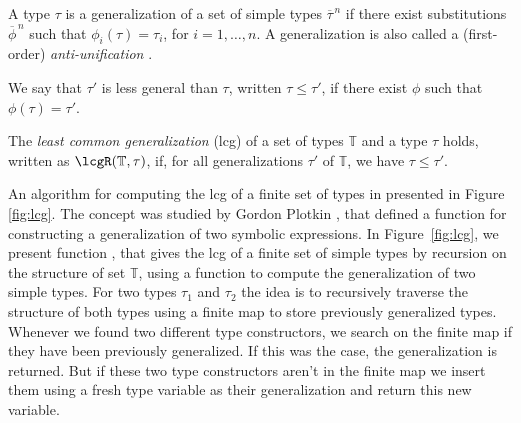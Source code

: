 A type $\tau$ is a generalization of a set of simple types
$\overline{\tau}^{\,n}$ if there exist substitutions
$\overline{\phi}^{\,n}$ such that $\phi_i(\tau)=\tau_i$, for
$i=1,\ldots,n$. A generalization is also called a (first-order) {\em
  anti-unification\/} \cite{ModelTheory2012}.

We say that $\tau'$ is less general than $\tau$, written $\tau \leq
\tau'$, if there exist $\phi$ such that $\phi(\tau) = \tau'$. 

The {\it least common generalization} (lcg) of a set of types
$\mathbb{T}$ and a type $\tau$ holds, written as
$\lcgR(\mathbb{T},\tau)$, if, for all generalizations $\tau'$ of
$\mathbb{T}$, we have $\tau \leq \tau'$.

An algorithm for computing the lcg of a finite set of types in
presented in Figure \ref{fig:lcg}. The concept was studied by Gordon
Plotkin \cite{plotkin1970note,plotkin1971further}, that defined a
function for constructing a generalization of two symbolic
expressions.  In Figure~\ref{fig:lcg}, we present function \lcg, that
gives the lcg of a finite set of simple types by recursion on the
structure of set $\mathbb{T}$, using a function to compute the
generalization of two simple types. For two types $\tau_1$ and
$\tau_2$ the idea is to recursively traverse the structure of both
types using a finite map to store previously generalized
types. Whenever we found two different type constructors, we search on
the finite map if they have been previously generalized. If this was
the case, the generalization is returned. But if these two type
constructors aren't in the finite map we insert them using a fresh
type variable as their generalization and return this new variable.

